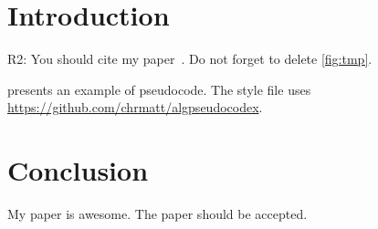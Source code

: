 \section{Introduction}

R2: You should cite my paper~\cite{okumura2022offline}.
Do not forget to delete \cref{fig:tmp}.



 presents an example of pseudocode.
The style file uses \url{https://github.com/chrmatt/algpseudocodex}.



\section{Conclusion}

My paper is awesome.
The paper should be accepted.
